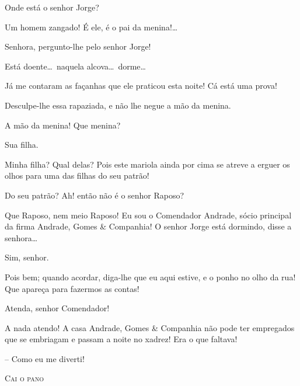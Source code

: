  Onde está o senhor Jorge?

  Um homem zangado! É ele, é o pai da
menina!\ldots

 Senhora, pergunto{}-lhe pelo senhor Jorge!

 Está doente\ldots\ naquela alcova\ldots\ dorme\ldots

 Já me contaram as façanhas que ele praticou esta noite!
 Cá está uma prova!

 Desculpe{}-lhe essa rapaziada, e não lhe negue a mão da
menina.

 A mão da menina! Que menina?

 Sua filha.

 Minha filha? Qual delas? Pois este mariola ainda por
cima se atreve a erguer os olhos para uma das filhas do seu patrão!

 Do seu patrão? Ah! então não é o senhor Raposo?

 Que Raposo, nem meio Raposo! Eu sou o Comendador
Andrade, sócio principal da firma Andrade, Gomes \& Companhia! O senhor
Jorge está dormindo, disse a senhora\ldots

 Sim, senhor.

 Pois bem; quando acordar, diga{}-lhe que eu aqui estive, e
o ponho no olho da rua! Que apareça para fazermos as contas!

 Atenda, senhor Comendador!

 A nada atendo! A casa Andrade, Gomes \& Companhia não
pode ter empregados que se embriagam e passam a noite no xadrez! Era o
que faltava! 

\pagebreak 
{}


  – Como eu me diverti!

\bigskip
\begin{center}
\textsc{Cai o pano}
\end{center}
